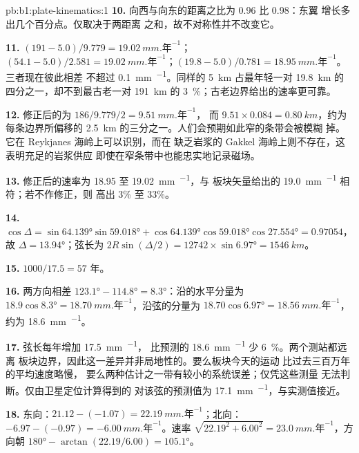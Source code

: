 \begin{solution}{pb:b1:plate-kinematics:1}
\textbf{10.} 向西与向东的距离之比为 0.96 比 0.98：东翼
增长多出几个百分点。仅取决于两距离
之和，故不对称性并不改变它。

\textbf{11.} $(191 - 5.0)/9.779 = \qty{19.02}{mm.\text{年}^{-1}}$；
$(54.1 - 5.0)/2.581 = \qty{19.02}{mm.\text{年}^{-1}}$；$(19.8 - 5.0)/0.781 =
\qty{18.95}{mm.\text{年}^{-1}}$。三者现在彼此相差
不超过 \qty{0.1}{mm.^{-1}}。同样的 \qty{5}{km} 占最年轻一对
\qty{19.8}{km} 的四分之一，却不到最古老一对 \qty{191}{km} 的
\qty{3}{\percent}；古老边界给出的速率更可靠。

\textbf{12.} 修正后的为 $186/9.779/2 = \qty{9.51}{mm.\text{年}^{-1}}$，
而 $9.51\times0.084 = \qty{0.80}{km}$，约为
每条边界所偏移的 \qty{2.5}{km} 的三分之一。人们会预期如此窄的条带会被模糊
掉。它在 Reykjanes 海岭上可以识别，而在
缺乏岩浆的 Gakkel 海岭上则不存在，这表明充足的岩浆供应
即使在窄条带中也能忠实地记录磁场。

\textbf{13.} 修正后的速率为 18.95 至 \qty{19.02}{mm.^{-1}}，与
板块矢量给出的 \qty{19.0}{mm.^{-1}} 相符；若不作修正，则
高出 3\% 至 33\%。

\textbf{14.} $\cos\Delta = \sin\ang{64.139}\sin\ang{59.018} +
\cos\ang{64.139}\cos\ang{59.018}\cos\ang{27.554} = 0.97054$，故 $\Delta =
\ang{13.94}$；弦长为 $2R\sin(\Delta/2) = 12742\times\sin\ang{6.97} =
\qty{1546}{km}$。

\textbf{15.} $1000/17.5 = 57$ 年。

\textbf{16.} 两方向相差 $\ang{123.1} - \ang{114.8} =
\ang{8.3}$：沿的水平分量为
$18.9\cos\ang{8.3} = \qty{18.70}{mm.\text{年}^{-1}}$，沿弦的分量为
$18.70\cos\ang{6.97} = \qty{18.56}{mm.\text{年}^{-1}}$，约为 \qty{18.6}{mm.^{-1}}。

\textbf{17.} 弦长每年增加 \qty{17.5}{mm.^{-1}}，
比预测的 \qty{18.6}{mm.^{-1}} 少 \qty{6}{\percent}。两个测站都远离
板块边界，因此这一差异并非局地性的。要么板块今天的运动
比过去三百万年的平均速度略慢，
要么两种估计之一带有较小的系统误差；仅凭这些测量
无法判断。仅由卫星定位计算得到的
对该弦的预测值为 \qty{17.1}{mm.^{-1}}，与实测值接近。

\textbf{18.} 东向：$21.12 - (-1.07) = \qty{22.19}{mm.\text{年}^{-1}}$；北向：
$-6.97 - (-0.97) = \qty{-6.00}{mm.\text{年}^{-1}}$。速率 $\sqrt{22.19^2 + 6.00^2} =
\qty{23.0}{mm.\text{年}^{-1}}$，方向朝 $\ang{180} - \arctan(22.19/6.00) =
\ang{105.1}$。


\end{solution}
